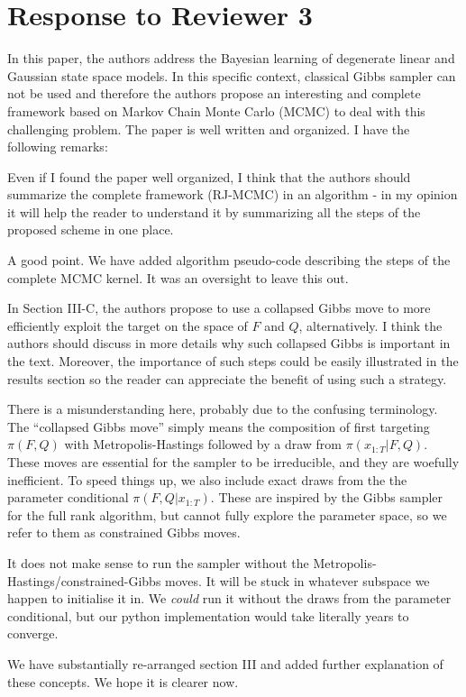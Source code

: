 \documentclass{article}
\newenvironment{review}[0]{\begin{itshape}\color{Gray}\noindent}{\end{itshape}\vspace{0.4cm}}
\newenvironment{response}[0]{\noindent}{\vspace{0.4cm}}
\begin{document}
\section*{Response to Reviewer 3}

\begin{review}
In this paper, the authors address the Bayesian learning of degenerate linear and Gaussian state space models. In this specific context, classical Gibbs sampler can not be used and therefore the authors propose an interesting and complete framework based on Markov Chain Monte Carlo (MCMC) to deal with this challenging problem. The paper is well written and organized. I have the following remarks:

Even if I found the paper well organized, I think that the authors should summarize the complete framework (RJ-MCMC) in an algorithm - in my opinion it will help the reader to understand it by summarizing all the steps of the proposed scheme in one place.
\end{review}

\begin{response}
 A good point. We have added algorithm pseudo-code describing the steps of the complete MCMC kernel. It was an oversight to leave this out.
\end{response}

\begin{review}
In Section III-C, the authors propose to use a collapsed Gibbs move to more efficiently exploit the target on the space of $F$ and $Q$, alternatively. I think the authors should discuss in more details why such collapsed Gibbs is important in the text. Moreover, the importance of such steps could be easily illustrated in the results section so the reader can appreciate the benefit of using such a strategy.
\end{review}

\begin{response}
 There is a misunderstanding here, probably due to the confusing terminology. The ``collapsed Gibbs move'' simply means the composition of first targeting $\pi(F, Q)$ with Metropolis-Hastings followed by a draw from $\pi(x_{1:T}|F, Q)$. These moves are essential for the sampler to be irreducible, and they are woefully inefficient. To speed things up, we also include exact draws from the the parameter conditional $\pi(F, Q|x_{1:T})$. These are inspired by the Gibbs sampler for the full rank algorithm, but cannot fully explore the parameter space, so we refer to them as constrained Gibbs moves.
 
 It does not make sense to run the sampler without the Metropolis-Hastings/constrained-Gibbs moves. It will be stuck in whatever subspace we happen to initialise it in. We {\em could} run it without the draws from the parameter conditional, but our python implementation would take literally years to converge.
 
 We have substantially re-arranged section III and added further explanation of these concepts. We hope it is clearer now.
\end{response}
\end{document}
